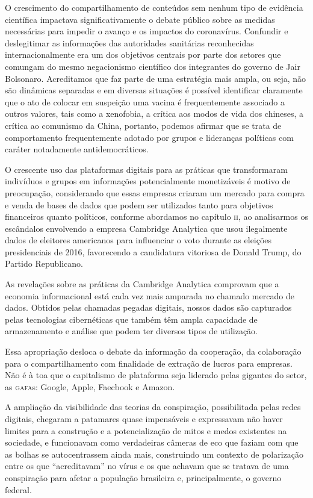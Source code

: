 O crescimento do compartilhamento de conteúdos sem nenhum tipo de
evidência científica impactava significativamente o debate público sobre
as medidas necessárias para impedir o avanço e os impactos do
coronavírus. Confundir e deslegitimar as informações das autoridades
sanitárias reconhecidas internacionalmente era um dos objetivos centrais
por parte dos setores que comungam do mesmo negacionismo científico dos
integrantes do governo de Jair Bolsonaro. Acreditamos que faz parte de
uma estratégia mais ampla, ou seja, não são dinâmicas separadas e em
diversas situações é possível identificar claramente que o ato de
colocar em suspeição uma vacina é frequentemente associado a outros
valores, tais como a xenofobia, a crítica aos modos de vida dos
chineses, a crítica ao comunismo da China, portanto, podemos afirmar que
se trata de comportamento frequentemente adotado por grupos e lideranças
políticas com caráter notadamente antidemocráticos.

O crescente uso das plataformas digitais para as práticas que
transformaram indivíduos e grupos em informações potencialmente
monetizáveis é motivo de preocupação, considerando que essas empresas
criaram um mercado para compra e venda de bases de dados que podem ser
utilizados tanto para objetivos financeiros quanto políticos, conforme
abordamos no capítulo \textsc{ii}, ao analisarmos os escândalos envolvendo a
empresa Cambridge Analytica que usou ilegalmente dados de eleitores
americanos para influenciar o voto durante as eleições presidenciais de
2016, favorecendo a candidatura vitoriosa de Donald Trump, do Partido
Republicano.

As revelações sobre as práticas da Cambridge Analytica comprovam que a
economia informacional está cada vez mais amparada no chamado mercado de
dados. Obtidos pelas chamadas pegadas digitais, nossos dados são
capturados pelas tecnologias cibernéticas que também têm ampla
capacidade de armazenamento e análise que podem ter diversos tipos de
utilização.

Essa apropriação desloca o debate da informação da cooperação, da
colaboração para o compartilhamento com finalidade de extração de lucros
para empresas. Não é à toa que o capitalismo de plataforma seja liderado
pelas gigantes do setor, as \textsc{gafa}s: Google, Apple, Faecbook e Amazon.

A ampliação da visibilidade das teorias da conspiração, possibilitada
pelas redes digitais, chegaram a patamares quase impensáveis e
expressavam não haver limites para a construção e a potencialização de
mitos e medos existentes na sociedade, e funcionavam como verdadeiras
câmeras de eco que faziam com que as bolhas se autocentrassem ainda
mais, construindo um contexto de polarização entre os que
``acreditavam'' no vírus e os que achavam que se tratava de uma
conspiração para afetar a população brasileira e, principalmente, o
governo federal.

